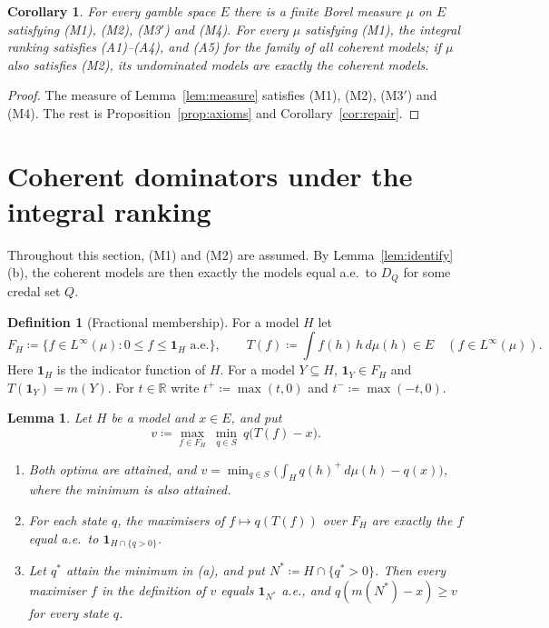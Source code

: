 \documentclass[11pt]{article}
\newcommand{\R}{\mathbb{R}}
\newcommand{\one}{\mathbf{1}}
\theoremstyle{plain}
\newtheorem{lemma}[theorem]{Lemma}
\newtheorem{corollary}[theorem]{Corollary}
\theoremstyle{definition}
\newtheorem{definition}[theorem]{Definition}
\begin{document}
\begin{corollary}\label{cor:existence}
For every gamble space $E$ there is a finite Borel measure $\mu$ on $E$ satisfying (M1), (M2),
(M3$'$) and (M4). For every $\mu$ satisfying (M1), the integral ranking satisfies (A1)--(A4),
and (A5) for the family of all coherent models; if $\mu$ also satisfies (M2), its undominated
models are exactly the coherent models.
\end{corollary}

\begin{proof}
The measure of Lemma~\ref{lem:measure} satisfies (M1), (M2), (M3$'$) and (M4). The rest is
Proposition~\ref{prop:axioms} and Corollary~\ref{cor:repair}.
\end{proof}

\section{Coherent dominators under the integral ranking}\label{sec:repair}

Throughout this section, (M1) and (M2) are assumed. By Lemma~\ref{lem:identify}(b), the
coherent models are then exactly the models equal a.e.\ to $D_Q$ for some credal set $Q$.

\begin{definition}[Fractional membership]\label{def:weighted}
For a model $H$ let
\[
  F_H\coloneqq\{f\in L^\infty(\mu):0\le f\le\one_H\text{ a.e.}\},\qquad
  T(f)\coloneqq\int f(h)\,h\,d\mu(h)\in E\quad(f\in L^\infty(\mu)).
\]
Here $\one_H$ is the indicator function of $H$. For a model $Y\subseteq
H$, $\one_Y\in F_H$ and $T(\one_Y)=m(Y)$. For $t\in\R$ write $t^+\coloneqq\max(t,0)$ and
$t^-\coloneqq\max(-t,0)$.
\end{definition}

\begin{lemma}\label{lem:minimax}
Let $H$ be a model and $x\in E$, and put
\[
  v\coloneqq\max_{f\in F_H}\ \min_{q\in S}\ q\bigl(T(f)-x\bigr).
\]
\begin{enumerate}[label=(\alph*)]
  \item Both optima are attained, and $v=\min_{q\in S}\bigl(\int_Hq(h)^+\,d\mu(h)-q(x)\bigr)$,
  where the minimum is also attained.
  \item For each state $q$, the maximisers of $f\mapsto q(T(f))$ over $F_H$ are exactly the
  $f$ equal a.e.\ to $\one_{H\cap\{q>0\}}$.
  \item Let $q^\ast$ attain the minimum in (a), and put $N^\ast\coloneqq H\cap\{q^\ast>0\}$.
  Then every maximiser $f$ in the definition of $v$ equals $\one_{N^\ast}$ a.e., and
  $q(m(N^\ast)-x)\ge v$ for every state $q$.
\end{enumerate}
\end{lemma}
\end{document}
